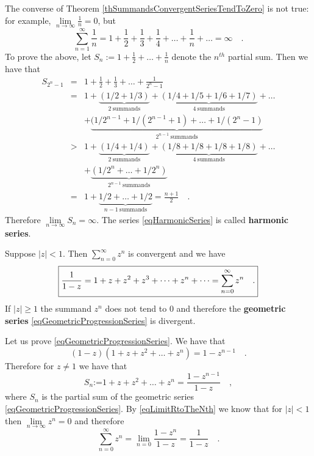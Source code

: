 \documentclass[12pt]{book}
\newcommand{\eqdef}{\textbf{:=}}
\newcommand{\importantFormula}[1]{\begin{equation} \boxed{#1} \end{equation}}
\renewcommand{\emph}{\textbf}
\begin{document}
The converse of Theorem \ref{thSummandsConvergentSeriesTendToZero} is not true: for example, $\lim\limits_{n\to \infty} \frac{1}{n}=0$, but
\begin{equation}\label{eqHarmonicSeries}
\sum_{n=1}^{\infty}\frac{1}n= 1+\frac{1}2+\frac13+\frac14+\dots +\frac1n+\dots=\infty\quad .
\end{equation}
To prove the above, let $S_n:=1+\frac{1}2+\dots +\frac{1}n$ denote the $n^{th}$ partial sum. Then we have that
\begin{equation*}
\begin{array}{rcl}
S_{2^n-1}&=&1+\frac{1}2+\frac13 +\dots +\frac{1}{2^n-1}\\
&=& 1+ \underbrace{\left(1/2+ 1/3\right)}_{\mathrm{2~summands}} +\underbrace{(1/4 +1/5+1/6+1/7)}_{\mathrm{4~summands}}+\dots \\
&&+ \underbrace{(1/2^{n-1}+1/(2^{n-1}+1)+\dots +1/(2^{n}-1)}_{2^{n-1}\mathrm{~summands}}\\
&>& 1+ \underbrace{\left(1/4+1/4\right)}_{\mathrm{2~summands}} +\underbrace{(1/8+1/8+1/8+1/8)}_{\mathrm{4~summands}}+\dots \\
&& + \underbrace{(1/2^{n}+\dots +1/2^{n})}_{2^{n-1}\mathrm{~summands}}\\
&=&1+\underbrace{  1/2+\dots +1/2}_{n-1\mathrm{~summands}}= \frac{n+1}2\quad .
\end{array}
\end{equation*}
Therefore $\lim\limits_{n\to \infty} S_{n}=\infty $. The series \eqref{eqHarmonicSeries} is called \emph{harmonic series}.

Suppose $|z|<1$. Then $\sum_{n=0}^{\infty} z^n$ is convergent and we have
\importantFormula{
\label{eqGeometricProgressionSeries}
\frac{1}{1-z}=1+z+z^2+z^3+\dots +z^n+\dots= \sum_{n=0}^{\infty} z^n\quad.
}
If $|z|\geq 1$ the summand $z^n$ does not tend to $0$ and therefore the \emph{geometric series} \eqref{eqGeometricProgressionSeries} is divergent. 

Let us prove \eqref{eqGeometricProgressionSeries}. We have that
\[(1-z)(1+z+z^2+\dots +z^{n})= 1- z^{n-1}\quad .
\]
Therefore for $z\neq 1$ we have that
\[
S_n\eqdef 1+z+z^2+\dots +z^n=\frac{1-z^{n-1}}{1-z}\quad ,
\]
where $S_n$ is the partial sum of the geometric series \eqref{eqGeometricProgressionSeries}. By \eqref{eqLimitRtoTheNth} we know that for $|z|<1$ then $\lim\limits_{n\to \infty} z^n=0$ and therefore
\[
\sum_{n=0}^{\infty}z^n=\lim\limits_{n=0} \frac{1-z^n}{1-z}= \frac{1}{1-z} \quad.
\]
\end{document}
